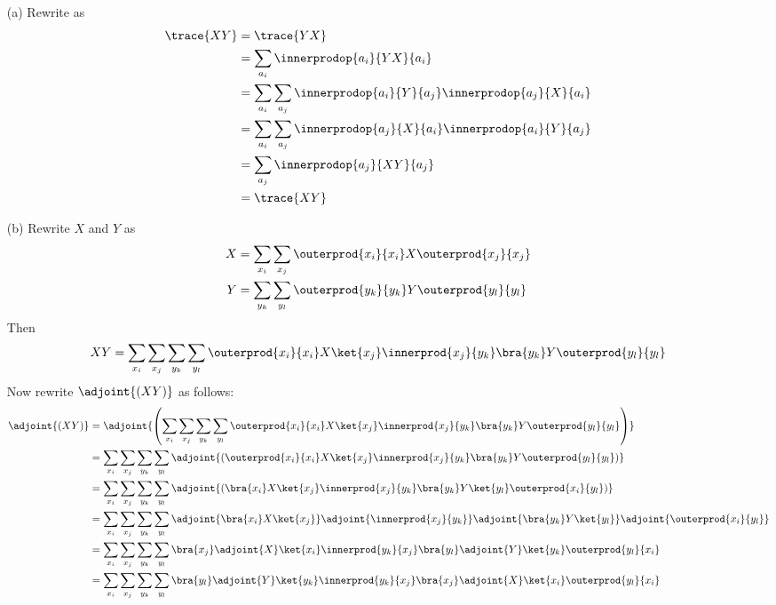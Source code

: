 \begin{itemize}
\item[(a)] Rewrite as
  \begin{align*}
    \trace{XY} &= \trace{YX} \\
    &=
    \sum_{a_i} \innerprodop{a_i}{YX}{a_i} \\
    &=
    \sum_{a_i}\sum_{a_j} \innerprodop{a_i}{Y}{a_j}\innerprodop{a_j}{X}{a_i}\\
    &=
    \sum_{a_i}\sum_{a_j} \innerprodop{a_j}{X}{a_i}\innerprodop{a_i}{Y}{a_j}\\
    &=
    \sum_{a_j} \innerprodop{a_j}{XY}{a_j}\\
    &=
    \trace{XY}
  \end{align*}
\item[(b)] Rewrite $X$ and $Y$ as
  \begin{align*}
    X &= \sum_{x_i}\sum_{x_j}\outerprod{x_i}{x_i}X\outerprod{x_j}{x_j} \\
    Y &= \sum_{y_k}\sum_{y_l}\outerprod{y_k}{y_k}Y\outerprod{y_l}{y_l}
  \end{align*}
  Then
  \[
  XY
  =
  \sum_{x_i}\sum_{x_j}\sum_{y_k}\sum_{y_l}
  \outerprod{x_i}{x_i}X\ket{x_j}
  \innerprod{x_j}{y_k}\bra{y_k}Y
  \outerprod{y_l}{y_l}
  \]
  Now rewrite $\adjoint{(XY)}$ as follows:
  \begin{align*}
    \adjoint{(XY)}
    &=
    \adjoint{\left(\sum_{x_i}\sum_{x_j}\sum_{y_k}\sum_{y_l}
      \outerprod{x_i}{x_i}X\ket{x_j}
      \innerprod{x_j}{y_k}\bra{y_k}Y
      \outerprod{y_l}{y_l}\right)} \\
    &=
    \sum_{x_i}\sum_{x_j}\sum_{y_k}\sum_{y_l}
    \adjoint{(\outerprod{x_i}{x_i}X\ket{x_j}
      \innerprod{x_j}{y_k}\bra{y_k}Y
      \outerprod{y_l}{y_l})} \\
    &=
    \sum_{x_i}\sum_{x_j}\sum_{y_k}\sum_{y_l}
    \adjoint{(\bra{x_i}X\ket{x_j}
      \innerprod{x_j}{y_k}\bra{y_k}Y\ket{y_l}
      \outerprod{x_i}{y_l})} \\
    &=
    \sum_{x_i}\sum_{x_j}\sum_{y_k}\sum_{y_l}
    \adjoint{\bra{x_i}X\ket{x_j}}
    \adjoint{\innerprod{x_j}{y_k}}
    \adjoint{\bra{y_k}Y\ket{y_l}}
    \adjoint{\outerprod{x_i}{y_l}} \\
    &=
    \sum_{x_i}\sum_{x_j}\sum_{y_k}\sum_{y_l}
    \bra{x_j}\adjoint{X}\ket{x_i}
    \innerprod{y_k}{x_j}\bra{y_l}
    \adjoint{Y}\ket{y_k}\outerprod{y_l}{x_i} \\
    &=
    \sum_{x_i}\sum_{x_j}\sum_{y_k}\sum_{y_l}
    \bra{y_l}\adjoint{Y}\ket{y_k}
    \innerprod{y_k}{x_j}\bra{x_j}
    \adjoint{X}\ket{x_i}\outerprod{y_l}{x_i} \\

\end{align*}
\end{itemize}
